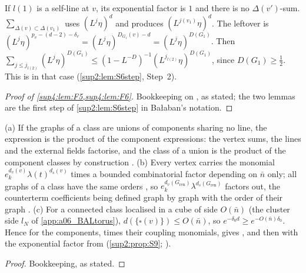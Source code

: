 \begin{lemma}[{F6: ``In the case $v=v'$ we make the same operations beginning with the summation over $\Delta(v)$'', \cite[p.~428]{Ba3}}]\label{sup4:lem:F6}
If $l(1)$ is a self-line at $v$, its exponential factor is $1$ and there is no $\Delta(v')$-sum. $\sum_{\Delta(v)\subset\Delta(v_1)}$ uses $(L^j\eta)^d$ and produces $(L^{j(v_1)}\eta)^d$. The leftover is $(L^j\eta)^{p_v-(d-2)-\delta_v}=(L^j\eta)^{D_{G_1}(v)-d}=(L^j\eta)^{D(G_1)}$. Then $\sum_{j\le j_{l(2)}}(L^j\eta)^{D(G_1)}\le(1-L^{-D})^{-1}(L^{j_{l(2)}}\eta)^{D(G_1)}$, since $D(G_1)\ge\frac12$. This is \cite[(2.15)]{Ba3} in that case (\cref{sup2:lem:S6step}, Step~2).
\end{lemma}

\begin{proof}[Proof of \cref{sup4:lem:F5,sup4:lem:F6}]
Bookkeeping on \cite[(2.14)]{Ba3}, as stated; the two lemmas are the first step of \cref{sup2:lem:S6step} in Ba{\l}aban's notation.
\end{proof}

\begin{lemma}\label{sup4:lem:F7}
\textup{(a)} If the graphs of a class are unions of components sharing no line, the expression is the product of the component expressions: the vertex sums, the lines and the external fields factorise, and the class of a union is the product of the component classes by construction \cite[pp.~431--432]{Ba3}. \textup{(b)} Every vertex carries the monomial $e_k^{d_v(v)}\lambda(t)^{d_s(v)}$ times a bounded combinatorial factor depending on $\bar n$ only; all graphs of a class have the same orders \cite[p.~420]{Ba3}, so $e_k^{d_v(G_{\mathrm{ren}})}\lambda^{d_s(G_{\mathrm{ren}})}$ factors out, the counterterm coefficients being defined graph by graph with the order of their graph \cite[p.~417]{Ba3}. \textup{(c)} For a connected class localised in a cube of side $O(\bar n)$ (the cluster side $l_N$ of \cref{app:a06_BALtorus}), $d(\{\square(v)\})\le O(\bar n)$, so $e^{-\delta_0d}\ge e^{-O(\bar n)\delta_0}$. Hence \cite[(3.3)]{Ba3} for the components, times their coupling monomials, gives \cite[(3.2)]{Ba3}, and then \cite[(1.33)]{Ba3} with the exponential factor from \cite[(3.1)]{Ba3} (\cref{sup2:prop:S9}; \cite[p.~432]{Ba3}).
\end{lemma}

\begin{proof}
Bookkeeping, as stated.
\end{proof}
